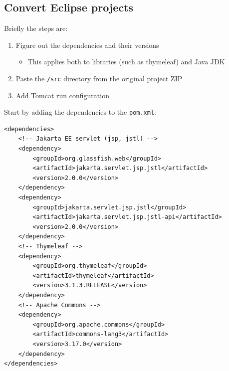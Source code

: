 \newpage

\subsection{Convert Eclipse projects}

Briefly the steps are:
\begin{enumerate}
  \item Figure out the dependencies and their versions
    \begin{itemize}
      \item This applies both to libraries (such as thymeleaf) and Java JDK
    \end{itemize}
  \item Paste the \texttt{/src} directory from the original project ZIP
  \item Add Tomcat run configuration
\end{enumerate}

Start by adding the dependencies to the \texttt{pom.xml}:
\begin{verbatim}
<dependencies>
    <!-- Jakarta EE servlet (jsp, jstl) -->
    <dependency>
        <groupId>org.glassfish.web</groupId>
        <artifactId>jakarta.servlet.jsp.jstl</artifactId>
        <version>2.0.0</version>
    </dependency>
    <dependency>
        <groupId>jakarta.servlet.jsp.jstl</groupId>
        <artifactId>jakarta.servlet.jsp.jstl-api</artifactId>
        <version>2.0.0</version>
    </dependency>
    <!-- Thymeleaf -->
    <dependency>
        <groupId>org.thymeleaf</groupId>
        <artifactId>thymeleaf</artifactId>
        <version>3.1.3.RELEASE</version>
    </dependency>
    <!-- Apache Commons -->
    <dependency>
        <groupId>org.apache.commons</groupId>
        <artifactId>commons-lang3</artifactId>
        <version>3.17.0</version>
    </dependency>
</dependencies>
\end{verbatim}

